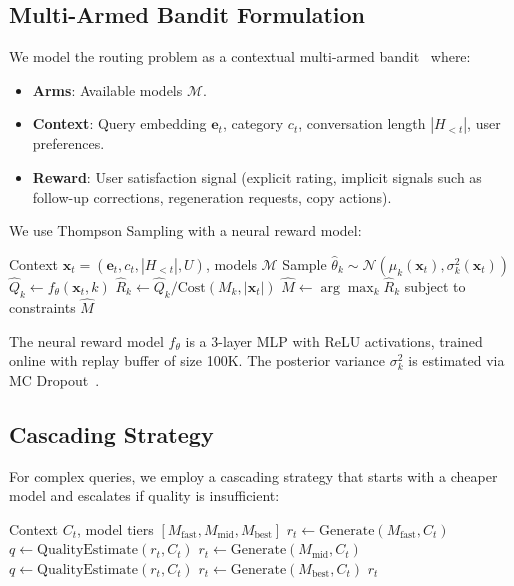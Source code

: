 \subsection{Multi-Armed Bandit Formulation}

We model the routing problem as a contextual multi-armed bandit~\cite{li2010contextual} where:

\begin{itemize}[leftmargin=1.1em]
    \item \textbf{Arms}: Available models $\mathcal{M}$.
    \item \textbf{Context}: Query embedding $\bm{e}_t$, category $c_t$, conversation length $|H_{<t}|$, user preferences.
    \item \textbf{Reward}: User satisfaction signal (explicit rating, implicit signals such as follow-up corrections, regeneration requests, copy actions).
\end{itemize}

We use Thompson Sampling with a neural reward model:

\begin{algorithm}[H]
\caption{Neural Thompson Sampling for Model Routing}
\label{alg:thompson}
\begin{algorithmic}[1]
\Require Context $\bm{x}_t = (\bm{e}_t, c_t, |H_{<t}|, U)$, models $\mathcal{M}$
    \State Sample $\hat{\theta}_k \sim \mathcal{N}(\mu_k(\bm{x}_t), \sigma_k^2(\bm{x}_t))$
    \State $\hat{Q}_k \gets f_\theta(\bm{x}_t, k)$ 
    \State $\hat{R}_k \gets \hat{Q}_k / \text{Cost}(M_k, |\bm{x}_t|)$ 
\EndFor
\State $\hat{M} \gets \arg\max_k \hat{R}_k$ subject to constraints
\State \Return $\hat{M}$
\end{algorithmic}
\end{algorithm}

The neural reward model $f_\theta$ is a 3-layer MLP with ReLU activations, trained online with replay buffer of size 100K. The posterior variance $\sigma_k^2$ is estimated via MC Dropout~\cite{gal2016dropout}.

\subsection{Cascading Strategy}

For complex queries, we employ a cascading strategy that starts with a cheaper model and escalates if quality is insufficient:

\begin{algorithm}[H]
\caption{Model Cascade}
\label{alg:cascade}
\begin{algorithmic}[1]
\Require Context $C_t$, model tiers $[M_{\text{fast}}, M_{\text{mid}}, M_{\text{best}}]$
\State $r_t \gets \text{Generate}(M_{\text{fast}}, C_t)$
\State $q \gets \text{QualityEstimate}(r_t, C_t)$
    \State $r_t \gets \text{Generate}(M_{\text{mid}}, C_t)$
    \State $q \gets \text{QualityEstimate}(r_t, C_t)$
        \State $r_t \gets \text{Generate}(M_{\text{best}}, C_t)$
    \EndIf
\EndIf
\State \Return $r_t$
\end{algorithmic}
\end{algorithm}

